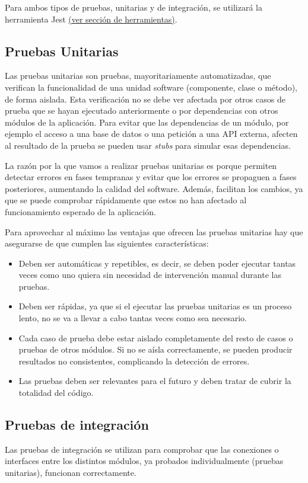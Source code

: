 Para ambos tipos de pruebas, unitarias y de integración, se utilizará la herramienta Jest \underline{(ver sección de herramientas)}.
\subsection{Pruebas Unitarias}
Las pruebas unitarias son pruebas, mayoritariamente automatizadas, que verifican la funcionalidad de una unidad software (componente, clase o método), de forma aislada. Esta verificación no se debe ver afectada por otros casos de prueba que se hayan ejecutado anteriormente o por dependencias con otros módulos de la aplicación. Para evitar que las dependencias de un módulo, por ejemplo el acceso a una base de datos o una petición a una API externa, afecten al resultado de la prueba se pueden usar \textit{stubs} para simular esas dependencias.

La razón por la que vamos a realizar pruebas unitarias es porque permiten detectar errores en fases tempranas y evitar que los errores se propaguen a fases posteriores, aumentando la calidad del software. Además, facilitan los cambios, ya que se puede comprobar rápidamente que estos no han afectado al funcionamiento esperado de la aplicación.

Para aprovechar al máximo las ventajas que ofrecen las pruebas unitarias hay que asegurarse de que cumplen las siguientes características:
\begin{itemize}
    \item Deben ser automáticas y repetibles, es decir, se deben poder ejecutar tantas veces como uno quiera sin necesidad de intervención manual durante las pruebas.
    \item Deben ser rápidas, ya que si el ejecutar las pruebas unitarias es un proceso lento, no se va a llevar a cabo tantas veces como sea necesario.
    \item Cada caso de prueba debe estar aislado completamente del resto de casos o pruebas de otros módulos. Si no se aísla correctamente, se pueden producir resultados no consistentes, complicando la detección de errores.
    \item Las pruebas deben ser relevantes para el futuro y deben tratar de cubrir la totalidad del código.
\end{itemize}
\subsection{Pruebas de integración}
Las pruebas de integración se utilizan para comprobar que las conexiones o interfaces entre los distintos módulos, ya probados individualmente (pruebas unitarias), funcionan correctamente.

